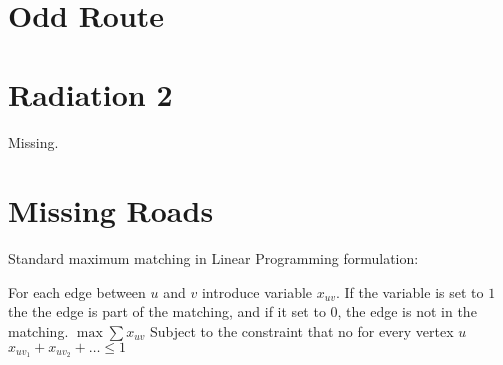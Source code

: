 \documentclass[a4paper, 10pt]{article}
\let\stdsection\section
\renewcommand\section{\newpage\stdsection}
\newcommand{\includecode}[1]{
    }
\newcommand{\algoAuthor}{2} %
\begin{document}
    \section{Odd Route}
        \label{sec:odd_route}
        \includecode{../problems/w13/OddRoute/OddRoute\algoAuthor.cpp}
        
    \section{Radiation 2}
        \label{sec:radiation_2}
        Missing.

    \section{Missing Roads}
        \label{sec:missing_roads}
        Standard maximum matching in Linear Programming formulation:

        For each edge between $u$ and $v$ introduce variable $x_{uv}$. If the variable is set to $1$ the the edge is part of the matching, 
        and if it set to 0, the edge is not in the matching.
        $\max \sum x_{uv}$
        Subject to the constraint that no for every vertex $u$
        $x_{uv_1} + x_{uv_2} + \dots \leq 1$
    
    
\end{document}

